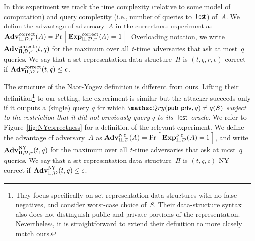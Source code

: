 In this experiment we track the time complexity (relative to some
model of computation) and query complexity (i.e., number of
queries to $\mathsf{Test}$) of~$A$.
We define the advantage of adversary~$A$ in the correctness experiment as
$\mathrm{\mathbf{Adv}}^{\mathrm{correct}}_{\Pi,\mathcal{D}_{}^{},r}(A) = \Pr\left[\: \mathrm{\mathbf{Exp}}^{\mathrm{correct}}_{\Pi,\mathcal{D}_{}^{}, r}(A)=1 \:\right]$.
Overloading notation, we write $\mathrm{\mathbf{Adv}}^{\mathrm{correct}}_{\Pi,\mathcal{D}_{}^{},r}(t,q)$ for the maximum over
all~$t$-time adversaries that ask at most~$q$ queries. We say that a
set-representation data structure~$\Pi$ is $(t,q,r,\epsilon)$-correct if $\mathrm{\mathbf{Adv}}^{\mathrm{correct}}_{\Pi,\mathcal{D}_{}^{},r}(t,q) \leq \epsilon$.


The structure of the Naor-Yogev definition is different from ours.
Lifting their definition\footnote{They focus specifically on set-representation data structures
with no false negatives, and consider worst-case choice of~$S$. Their data-structure syntax
also does not distinguish public and private portions of the representation. Nevertheless, it is straightforward
to extend their definition to more closely match ours.}
to our setting,
the experiment is similar but the attacker
succeeds only if it outputs a (single) query $q$ for which
$\Qry(\pubaux,\privaux, q) \neq q(S)$  \emph{subject to the restriction that it did not
previously query $q$ to its $\mathsf{Test}$ oracle}. We refer to
Figure~\ref{fig:NYcorrectness} for a definition of the relevant experiment.
We define the advantage of adversary~$A$ as
$\mathrm{\mathbf{Adv}}^{\mathrm{NY}}_{\Pi,\mathcal{D}_{}^{}}(A) = \Pr\left[\: \mathrm{\mathbf{Exp}}^{\mathrm{NY}}_{\Pi,\mathcal{D}_{}^{}}(A)=1 \:\right]$,
and write $\mathrm{\mathbf{Adv}}^{\mathrm{NY}}_{\Pi,\mathcal{D}_{}^{},r}(t,q)$ for the maximum over
all~$t$-time adversaries that ask at most~$q$ queries. We say that a
set-representation data structure~$\Pi$ is $(t,q,\epsilon)$-NY-correct if
$\mathrm{\mathbf{Adv}}^{\mathrm{NY}}_{\Pi,\mathcal{D}_{}^{}}(t,q) \leq \epsilon$. 

